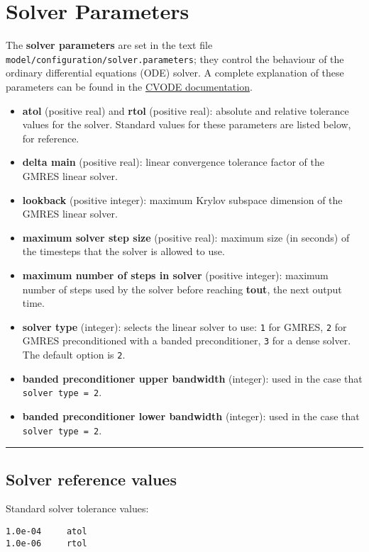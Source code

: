\section{Solver Parameters} \label{sec:solver}

The \textbf{solver parameters} are set in the text file
\texttt{model/configuration/solver.parameters}; they control the
behaviour of the ordinary differential equations (ODE) solver. A
complete explanation of these parameters can be found in the
\href{https://computation.llnl.gov/projects/sundials/sundials-software}{CVODE
documentation}.

\begin{itemize}
\item
  \textbf{atol} (positive real) and \textbf{rtol} (positive real):
  absolute and relative tolerance values for the solver. Standard values
  for these parameters are listed below, for reference.
\item
  \textbf{delta main} (positive real): linear convergence tolerance
  factor of the GMRES linear solver.
\item
  \textbf{lookback} (positive integer): maximum Krylov subspace
  dimension of the GMRES linear solver.
\item
  \textbf{maximum solver step size} (positive real): maximum size (in
  seconds) of the timesteps that the solver is allowed to use.
\item
  \textbf{maximum number of steps in solver} (positive integer): maximum
  number of steps used by the solver before reaching \textbf{tout}, the
  next output time.
\item
  \textbf{solver type} (integer): selects the linear solver to use:
  \texttt{1} for GMRES, \texttt{2} for GMRES preconditioned with a
  banded preconditioner, \texttt{3} for a dense solver. The default
  option is \texttt{2}.
\item
  \textbf{banded preconditioner upper bandwidth} (integer): used in the
  case that \texttt{solver\ type\ =\ 2}.
\item
  \textbf{banded preconditioner lower bandwidth} (integer): used in the
  case that \texttt{solver\ type\ =\ 2}.
\end{itemize}

\begin{center}\rule{0.5\linewidth}{\linethickness}\end{center}

\subsection{Solver reference values}\label{solver-reference-values}

Standard solver tolerance values:

\begin{verbatim}
1.0e-04     atol
1.0e-06     rtol
\end{verbatim}
